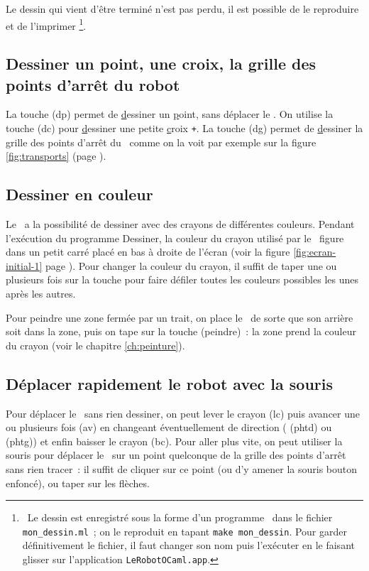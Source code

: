 Le dessin qui vient d'être terminé n'est pas perdu, il est
possible de le reproduire et de l'im\-pri\-mer%
\footnote{\ Le dessin est enregistré sous la forme d'un programme \ocaml\ dans 
le fichier {\tt mon\_dessin.ml}~; on le reproduit en tapant {\tt make mon\_dessin}. Pour garder
définitivement le fichier, il faut changer son nom puis l'exécuter en le faisant glisser sur l'application
\texttt{LeRobotOCaml.app}.}.
 

\subsection{Dessiner un point, une croix, la grille des points d'arrêt du robot}

La touche  ({\idt dp}) permet de \underline{d}essiner un 
\underline{p}oint, sans déplacer le \robot. On utilise la
touche  ({\idt dc}) pour \underline{d}essiner une petite
\underline{c}roix {\tt +}. La touche  ({\idt dg})
permet de \underline{d}essiner la \underline{g}rille des points 
d'arrêt du \robot\ comme on la voit par exemple sur la figure
\ref{fig:transports} (page \pageref{fig:transports}).

\subsection{Dessiner en couleur}

Le \robot\ a la
possibilité de dessiner avec des crayons de différentes couleurs.
Pendant l'exé\-cu\-tion du programme {\idt Des\-si\-ner}, 
la couleur du crayon utilisé par le \robot\ figure dans un petit carré 
placé en bas à droite de l'écran (voir la figure \ref{fig:ecran-initial-1}
page \pageref{fig:ecran-initial-1}). Pour changer la couleur du crayon, 
il suffit de taper une ou plusieurs fois sur la touche \touche{*} pour faire
défiler toutes les couleurs possibles les unes
après les autres.

Pour peindre une zone fermée par un trait, on place le \robot\ de sorte
que son arrière soit dans la zone, puis on tape sur la touche 
({\idt peindre})~: la zone prend la couleur du crayon (voir le chapitre
\ref{ch:peinture}).

\subsection{Déplacer rapidement le robot avec la souris}

Pour déplacer le \robot\ sans rien dessiner, on peut lever le crayon
 ({\idt lc}) puis avancer une ou plusieurs fois 
 ({\idt av}) en changeant éventuellement de direction
( ({\idt phtd}) ou  ({\idt phtg})) et enfin baisser
le crayon  ({\idt bc}). Pour aller plus vite, on peut utiliser
la souris pour déplacer le \robot\ sur un point quelconque de la grille 
des points d'arrêt sans rien tracer~: il suffit de cliquer sur ce point (ou d'y
amener la souris bouton enfoncé), ou taper sur les flèches.


